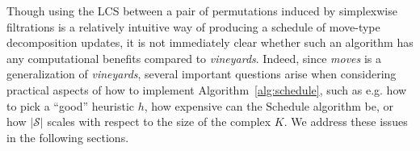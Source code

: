 \documentclass[sn-mathphys]{sn-jnl}
\begin{document}

Though using the LCS between a pair of permutations induced by simplexwise filtrations is a relatively intuitive way of producing a schedule of move-type decomposition updates, it is not immediately clear whether such an algorithm has any computational benefits compared to \emph{vineyards}. 
Indeed, since \emph{moves} is a generalization of \emph{vineyards}, several important questions arise when considering practical aspects of how to implement Algorithm~\ref{alg:schedule}, such as e.g. how to pick a ``good'' heuristic $h$, how expensive can the $\text{Schedule}$ algorithm be, or how  $\lvert \mathcal{S}\rvert$ scales with respect to the size of the complex $K$. We address these issues in the following sections. 

\end{document}
